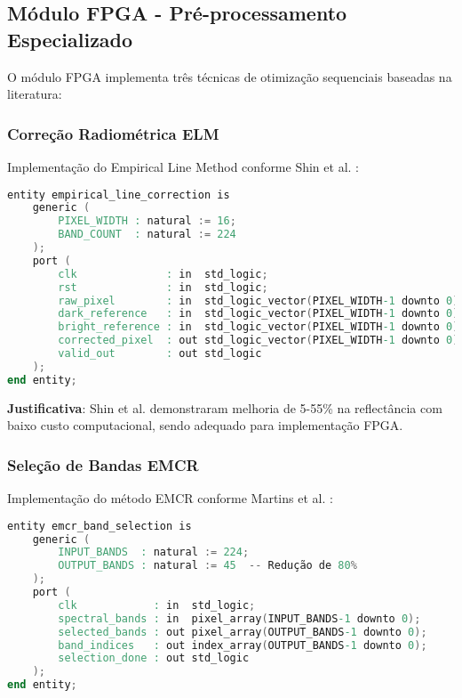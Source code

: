 \subsection{Módulo FPGA - Pré-processamento Especializado}

O módulo FPGA implementa três técnicas de otimização sequenciais baseadas na literatura:

\subsubsection{Correção Radiométrica ELM}

Implementação do Empirical Line Method conforme Shin et al. \cite{shin2024}:

\begin{lstlisting}[language=verilog, caption=Módulo ELM em VHDL]
entity empirical_line_correction is
    generic (
        PIXEL_WIDTH : natural := 16;
        BAND_COUNT  : natural := 224
    );
    port (
        clk              : in  std_logic;
        rst              : in  std_logic;
        raw_pixel        : in  std_logic_vector(PIXEL_WIDTH-1 downto 0);
        dark_reference   : in  std_logic_vector(PIXEL_WIDTH-1 downto 0);
        bright_reference : in  std_logic_vector(PIXEL_WIDTH-1 downto 0);
        corrected_pixel  : out std_logic_vector(PIXEL_WIDTH-1 downto 0);
        valid_out        : out std_logic
    );
end entity;
\end{lstlisting}

\textbf{Justificativa}: Shin et al. demonstraram melhoria de 5-55\% na reflectância com baixo custo computacional, sendo adequado para implementação FPGA.

\subsubsection{Seleção de Bandas EMCR}

Implementação do método EMCR conforme Martins et al. \cite{martins2019}:

\begin{lstlisting}[language=verilog, caption=Seleção EMCR em VHDL]
entity emcr_band_selection is
    generic (
        INPUT_BANDS  : natural := 224;
        OUTPUT_BANDS : natural := 45  -- Redução de 80%
    );
    port (
        clk            : in  std_logic;
        spectral_bands : in  pixel_array(INPUT_BANDS-1 downto 0);
        selected_bands : out pixel_array(OUTPUT_BANDS-1 downto 0);
        band_indices   : out index_array(OUTPUT_BANDS-1 downto 0);
        selection_done : out std_logic
    );
end entity;
\end{lstlisting}

